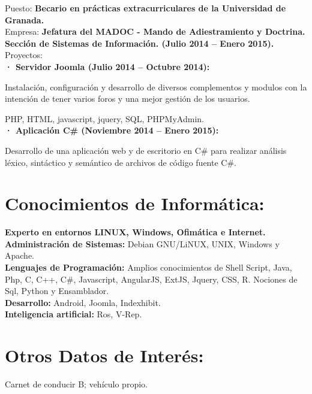 \documentclass	[10pt,a4paper,oneside]{article}
\newcommand{\seccion}[1]{\vspace*{3mm}\section*{#1}\vspace*{-3mm}}
\begin{document}
Puesto: \textbf{Becario en prácticas extracurriculares de la Universidad de Granada.}\\
Empresa: \textbf{Jefatura del MADOC - Mando de Adiestramiento y Doctrina. Sección de Sistemas de Información. (Julio 2014 – Enero 2015).}\\
Proyectos:\\
\hspace*{1cm}\textbf{· Servidor Joomla (Julio 2014 – Octubre 2014):}\par
{\addtolength{\leftskip}{2cm}Instalación, configuraci\'on y desarrollo de diversos complementos y modulos con la intención de tener varios foros y una mejor gestión de los usuarios.\par}
\hspace*{2cm}PHP, HTML, javascript, jquery, SQL, PHPMyAdmin.\\
\hspace*{1cm}\textbf{· Aplicación C\# (Noviembre 2014 – Enero 2015):}\par
{\addtolength{\leftskip}{2cm}
Desarrollo de una aplicación web y de escritorio en C\# para realizar análisis léxico, sintáctico y semántico de archivos de código fuente C\#.\par}


\seccion{Conocimientos de Informática:}
\textbf{Experto en entornos LINUX, Windows, Ofimática e Internet.}\\
\textbf{Administración de Sistemas:} Debian GNU/LiNUX, UNIX, Windows y Apache.\\
\textbf{Lenguajes de Programación:} Amplios conocimientos de Shell Script, Java, Php, C,
C++, C\#, Javascript, AngularJS, ExtJS, Jquery, CSS, R. Nociones de Sql, Python y Ensamblador.\\
\textbf{Desarrollo:} Android, Joomla, Indexhibit.\\
\textbf{Inteligencia artificial:} Ros, V-Rep.


\seccion{Otros Datos de Interés:}
Carnet de conducir B; vehículo propio.\\
\end{document}
